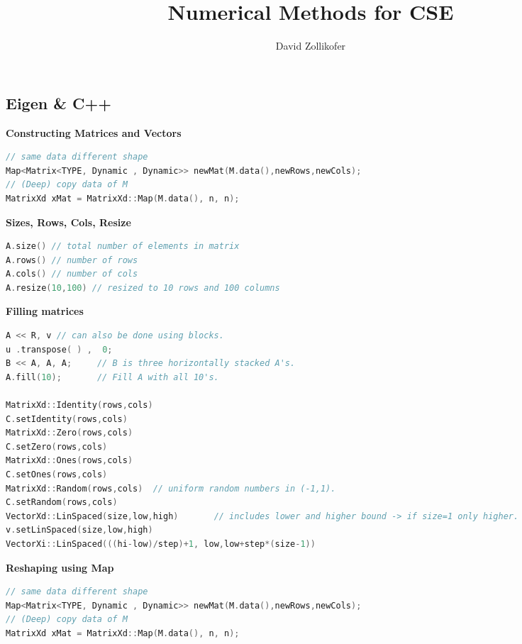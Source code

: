 \documentclass{sciposter}
\title{\huge{Numerical Methods for CSE}}
\author{\large{David Zollikofer}}
\newcommand{\psection}[1]{\par \textbf{\large#1}}
\begin{document}

\maketitle



\begin{multicols}{2}
\section{Eigen \& C++}

\psection{Constructing Matrices and Vectors}
\begin{lstlisting}[language=C++]
// same data different shape
Map<Matrix<TYPE, Dynamic , Dynamic>> newMat(M.data(),newRows,newCols);
// (Deep) copy data of M
MatrixXd xMat = MatrixXd::Map(M.data(), n, n);
\end{lstlisting}


\psection{Sizes, Rows, Cols, Resize}
\begin{lstlisting}[language=C++]
A.size() // total number of elements in matrix
A.rows() // number of rows
A.cols() // number of cols
A.resize(10,100) // resized to 10 rows and 100 columns
\end{lstlisting}


\psection{Filling matrices}
\begin{lstlisting}[language=C++]
A << R,	v // can also be done using blocks. 
u .transpose( ) ,  0;
B << A, A, A;     // B is three horizontally stacked A's.
A.fill(10);       // Fill A with all 10's.

MatrixXd::Identity(rows,cols)          
C.setIdentity(rows,cols)                 
MatrixXd::Zero(rows,cols)                
C.setZero(rows,cols)                      
MatrixXd::Ones(rows,cols)          
C.setOnes(rows,cols)                 
MatrixXd::Random(rows,cols)  // uniform random numbers in (-1,1).
C.setRandom(rows,cols)                 
VectorXd::LinSpaced(size,low,high)       // includes lower and higher bound -> if size=1 only higher. 
v.setLinSpaced(size,low,high)         
VectorXi::LinSpaced(((hi-low)/step)+1, low,low+step*(size-1))
\end{lstlisting}



\psection{Reshaping using Map}
\begin{lstlisting}[language=C++]
// same data different shape
Map<Matrix<TYPE, Dynamic , Dynamic>> newMat(M.data(),newRows,newCols);
// (Deep) copy data of M
MatrixXd xMat = MatrixXd::Map(M.data(), n, n);
\end{lstlisting}



\end{multicols}
\end{document}
